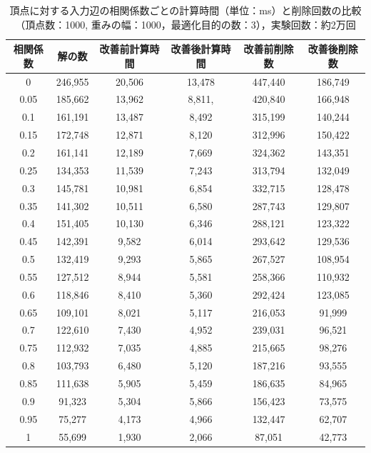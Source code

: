 \documentclass[12pt]{optlab-bachelor}
\begin{document}
\begin{table}[h]
  \centering
  \caption{頂点に対する入力辺の相関係数ごとの計算時間（単位：ms）と削除回数の比較（頂点数：1000,
  重みの幅：1000，最適化目的の数：3），実験回数：約2万回}
  {\small
  \begin{tabular}{|c|c|c|c|c|c|} \hline
    相関係数 & 解の数 & 改善前計算時間 & 改善後計算時間 & 改善前削除数 & 改善後削除数 \\ \hline
    0     & 246,955 & 20,506 & 13,478 & 447,440 & 186,749 \\ \hline
    0.05  & 185,662 & 13,962 & 8,811, & 420,840 & 166,948 \\ \hline
    0.1   & 161,191 & 13,487 & 8,492 & 315,199 & 140,244 \\ \hline
    0.15  & 172,748 & 12,871 & 8,120 & 312,996 & 150,422 \\ \hline
    0.2   & 161,141 & 12,189 & 7,669 & 324,362 & 143,351 \\ \hline
    0.25  & 134,353 & 11,539 & 7,243 & 313,794 & 132,049 \\ \hline
    0.3   & 145,781 & 10,981 & 6,854 & 332,715 & 128,478 \\ \hline
    0.35  & 141,302 & 10,511 & 6,580 & 287,743 & 129,807 \\ \hline
    0.4   & 151,405 & 10,130 & 6,346 & 288,121 & 123,322 \\ \hline
    0.45  & 142,391 & 9,582  & 6,014 & 293,642 & 129,536 \\ \hline
    0.5   & 132,419 & 9,293  & 5,865 & 267,527 & 108,954 \\ \hline
    0.55  & 127,512 & 8,944  & 5,581 & 258,366 & 110,932 \\ \hline
    0.6   & 118,846 & 8,410  & 5,360 & 292,424 & 123,085 \\ \hline
    0.65  & 109,101 & 8,021  & 5,117 & 216,053 & 91,999 \\ \hline
    0.7   & 122,610 & 7,430  & 4,952 & 239,031 & 96,521 \\ \hline
    0.75  & 112,932 & 7,035  & 4,885 & 215,665 & 98,276 \\ \hline
    0.8   & 103,793 & 6,480  & 5,120 & 187,216 & 93,555 \\ \hline
    0.85  & 111,638 & 5,905  & 5,459 & 186,635 & 84,965 \\ \hline
    0.9   & 91,323  & 5,304  & 5,866 & 156,423 & 73,575 \\ \hline
    0.95  & 75,277  & 4,173  & 4,966 & 132,447 & 62,707 \\ \hline
    1     & 55,699  & 1,930  & 2,066 & 87,051  & 42,773 \\ \hline
  \end{tabular}
  }
\end{table}
\end{document}
